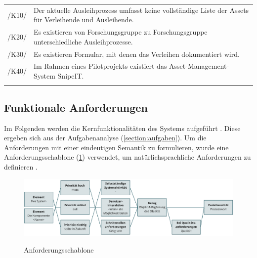 \begin{center}
        \renewcommand{\arraystretch}{1.5}
        \begin{longtable}{lp{}} \arrayrulecolor{maincolor}\hline
                 \sffamily\color{maincolor}/K10/ & Der aktuelle Ausleihprozess umfasst keine
                 vollständige Liste der Assets für Verleihende und Ausleihende. \\
                 \sffamily\color{maincolor}/K20/ & Es existieren von Forschungsgruppe zu
                Forschungsgruppe unterschiedliche Ausleihprozesse. \\
                \sffamily\color{maincolor}/K30/ & Es existieren Formular, mit denen das Verleihen
                dokumentiert wird. \\
                \sffamily\color{maincolor}/K40/ & Im Rahmen eines Pilotprojekts existiert das
                Asset-Management-System SnipeIT. \\
                \arrayrulecolor{maincolor}\hline
        \end{longtable}
\end{center}

\vspace*{-1.5cm}

\subsection{Funktionale Anforderungen}
\label{section:funktionale}
Im Folgenden werden die Kernfunktionalitäten des Systems aufgeführt \cite{balzert2009}. Diese
ergeben sich aus der Aufgabenanalyse (\ref{section:aufgaben}). Um die Anforderungen mit einer
eindeutigen Semantik zu formulieren, wurde eine Anforderungsschablone (\ref{fig:schablone})
verwendet, um natürlichsprachliche Anforderungen zu definieren \cite{balzert2009}.

\begin{figure}[h]
        \centering
        \includegraphics[scale=0.45]{Bilder/anforderungsschablone.pdf}
        \label{fig:schablone}
        \caption[Anforderungsschablone]{Anforderungsschablone \cite{balzert2009}}
\end{figure}


